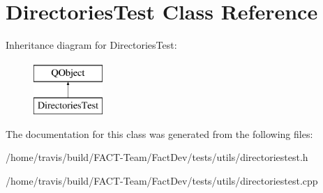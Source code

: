 \hypertarget{classDirectoriesTest}{\section{Directories\-Test Class Reference}
\label{classDirectoriesTest}
}
Inheritance diagram for Directories\-Test\-:\begin{figure}[H]
\begin{center}
\leavevmode
\includegraphics[height=2.000000cm]{d4/d7d/classDirectoriesTest}
\end{center}
\end{figure}


The documentation for this class was generated from the following files\-:\begin{DoxyCompactItemize}
\item 
/home/travis/build/\-F\-A\-C\-T-\/\-Team/\-Fact\-Dev/tests/utils/directoriestest.\-h\item 
/home/travis/build/\-F\-A\-C\-T-\/\-Team/\-Fact\-Dev/tests/utils/directoriestest.\-cpp\end{DoxyCompactItemize}
